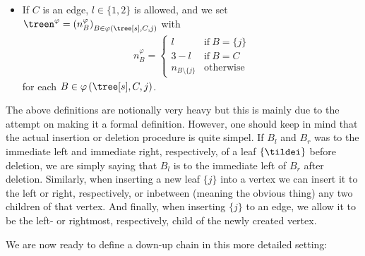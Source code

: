 {\begin{defi}
\begin{itemize}
\begin{align}
                n_B^\varphi
                =
                \begin{cases}
                    l & \text{if}\ B = \{j\} \\
                    n_B + 1 & \text{if}\ C = \overleftarrow{B}\ \text{and}\ n_B \geq l \\
                    n_{B \setminus \{j\}} & \text{otherwise}
                \end{cases}
                \label{insertionnumbersplanar1}
            \end{align}
            for each $B \in \varphi \left( \tree[s], C, j \right)$.
        \item If $C$ is an edge, $l \in \{1, 2\}$ is allowed, and we set $\treen^\varphi = {\left( n_B^\varphi \right)}_{B \in \varphi \left( \tree[s], C, j \right)}$ with
            \begin{align}
                n_B^\varphi
                =
                \begin{cases}
                    l & \text{if}\ B = \{j\} \\
                    3 - l & \text{if}\ B = C \\
                    n_{B \setminus \{j\}} & \text{otherwise}
                \end{cases}
                \label{insertionnumbersplanar2}
            \end{align}
            for each $B \in \varphi \left( \tree[s], C, j \right)$.
    \end{itemize}
\end{defi}
%
The above definitions are notionally very heavy but this is mainly due to the attempt on making it a formal definition.
However, one should keep in mind that the actual insertion or deletion procedure is quite simpel.
If $B_l$ and $B_r$ was to the immediate left and immediate right, respectively, of a leaf $\{ \tildei \}$ before deletion, we are simply saying that $B_l$ is to the immediate left of $B_r$ after deletion.
Similarly, when inserting a new leaf $\{j\}$ into a vertex we can insert it to the left or right, respectively, or inbetween (meaning the obvious thing) any two children of that vertex.
And finally, when inserting $\{j\}$ to an edge, we allow it to be the left- or rightmost, respectively, child of the newly created vertex.
}
%
We are now ready to define a down-up chain in this more detailed setting:
%

